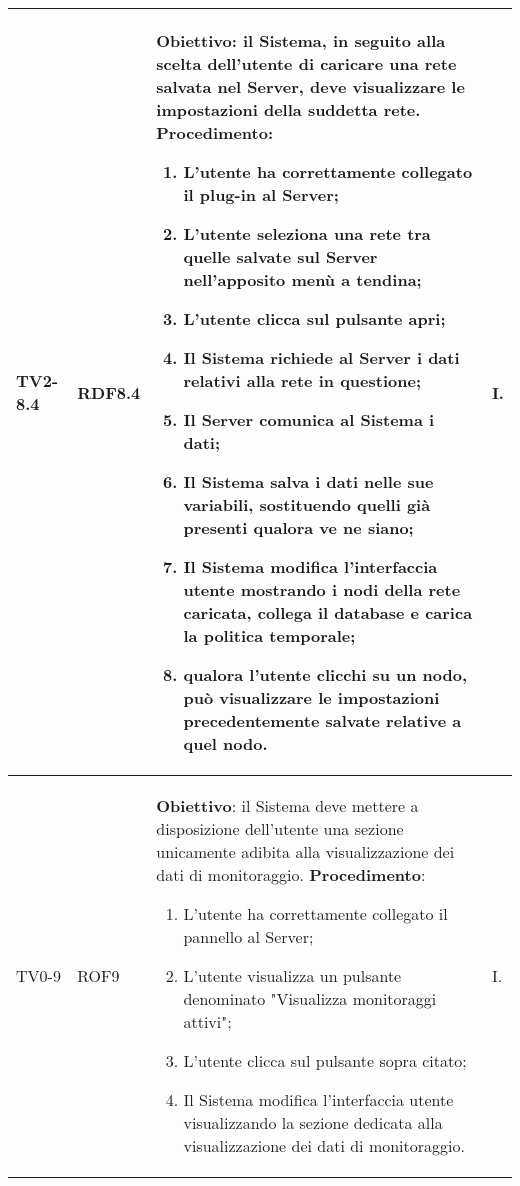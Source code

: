 \begin{longtable}{|C{.15\textwidth}|C{.13\textwidth}|m{.52\textwidth}|C{.08\textwidth}|}
TV2-8.4 & RDF8.4 &
	\textbf{Obiettivo}: il Sistema, in seguito alla scelta dell'utente di caricare una rete salvata nel Server, deve visualizzare le impostazioni della suddetta rete. \newline
	\textbf{Procedimento}:
	\begin{enumerate}
		\item L'utente ha correttamente collegato il plug-in al Server;
		\item L'utente seleziona una rete tra quelle salvate sul Server nell'apposito menù a tendina;
		\item L'utente clicca sul pulsante apri;
		\item Il Sistema richiede al Server i dati relativi alla rete in questione;
		\item Il Server comunica al Sistema i dati;
		\item Il Sistema salva i dati nelle sue variabili, sostituendo quelli già presenti qualora ve ne siano;
		\item Il Sistema modifica l'interfaccia utente mostrando i nodi della rete caricata, collega il database e carica la politica temporale;
		\item qualora l'utente clicchi su un nodo, può visualizzare le impostazioni precedentemente salvate relative a quel nodo.
	\end{enumerate}
	& I. \\
\hline	

TV0-9 & ROF9 &
	\textbf{Obiettivo}: il Sistema deve mettere a disposizione dell'utente una sezione unicamente adibita alla visualizzazione dei dati di monitoraggio. \newline
	\textbf{Procedimento}:
	\begin{enumerate}
		\item L'utente ha correttamente collegato il pannello al Server;
		\item L'utente visualizza un pulsante denominato "Visualizza monitoraggi attivi";
		\item L'utente clicca sul pulsante sopra citato;
		\item Il Sistema modifica l'interfaccia utente visualizzando la sezione dedicata alla visualizzazione dei dati di monitoraggio.
	\end{enumerate}
	& I. \\
\hline	


\end{longtable}
